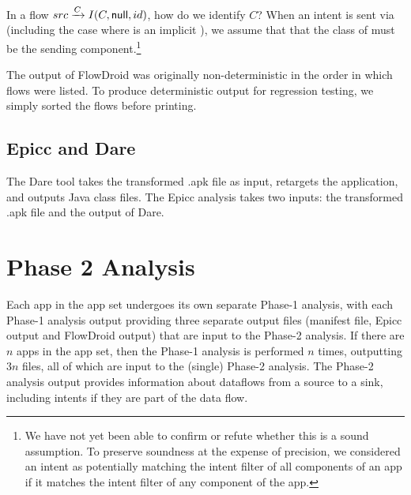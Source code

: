 {\begin{sloppypar}
In a flow $src \xrightarrow{C} I(C,\textsf{null},id)$, how do we identify $C$?
When an intent is sent via  (including the case where  is an implicit ), we assume that
that the class of  must be
the sending component.\footnote{%
We have not yet been able to confirm or refute whether this is 
a sound assumption.  
To preserve soundness at the expense of precision, we considered an intent as
potentially matching the intent filter of all components of an app if it matches
the intent filter of any component of the app.
}
\end{sloppypar}


The output of FlowDroid 
was originally
non-deterministic in the order in which flows were listed.  To produce
deterministic output for regression testing, we simply sorted the flows before
printing.%


\subsection{Epicc and Dare} \label{para:epiccAndDare}
The Dare \cite{octeau2012retargeting} tool takes the transformed .apk file as
input, retargets the application, and outputs Java class files.
The Epicc analysis takes two inputs: the transformed .apk file and the output of Dare.


\section{Phase 2 Analysis} \label{subsec:phase2}
Each app in the app set undergoes its own separate Phase-1 analysis, with each Phase-1 analysis output providing three separate output files (manifest file, Epicc output and FlowDroid output) that are input to the Phase-2 analysis. If there are $n$ apps in the app set, then the Phase-1 analysis is performed $n$ times, outputting $3n$ files, all of which are input to the (single) Phase-2 analysis. The Phase-2 analysis output provides information about dataflows from a source to a sink, including intents if they are part of the data flow.


}
